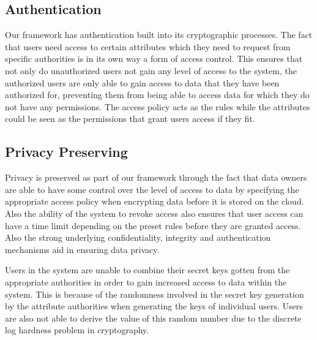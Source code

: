 \subsection*{Authentication}

Our framework has authentication built into its cryptographic processes. The fact that users need access to certain attributes which they need to request from specific authorities is in its own way a form of access control. This ensures that not only do unauthorized users not gain any level of access to the system, the authorized users are only able to gain access to data that they have been authorized for, preventing them from being able to access data for which they do not have any permissions. The access policy acts as the rules while the attributes could be seen as the permissions that grant users access if they fit.

\subsection*{Privacy Preserving}

Privacy is preserved as part of our framework through the fact that data owners are able to have some control over the level of access to data by specifying the appropriate access policy when encrypting data before it is stored on the cloud. Also the ability of the system to revoke access also ensures that user access can have a time limit depending on the preset rules before they are granted access. Also the strong underlying confidentiality, integrity and authentication mechanisms aid in ensuring data privacy.

Users in the system are unable to combine their secret keys gotten from the appropriate authorities in order to gain increased access to data within the system. This is because of the randomness involved in the secret key generation by the attribute authorities when generating the keys of individual users. Users are also not able to derive the value of this random number due to the discrete log hardness problem in cryptography.